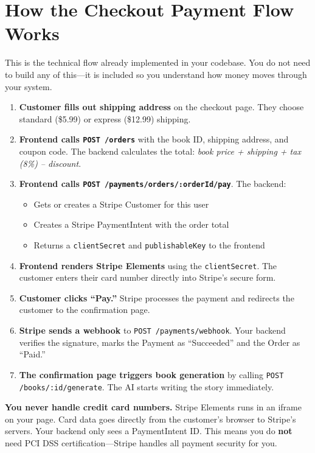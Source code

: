 \documentclass[12pt, letterpaper, oneside]{book}
\begin{document}
\section{How the Checkout Payment Flow Works}

This is the technical flow already implemented in your codebase. You do not need to build any of this---it is included so you understand how money moves through your system.

\begin{enumerate}[leftmargin=2em]
  \item \textbf{Customer fills out shipping address} on the checkout page. They choose standard (\$5.99) or express (\$12.99) shipping.
  \item \textbf{Frontend calls \texttt{POST /orders}} with the book ID, shipping address, and coupon code. The backend calculates the total: \textit{book price + shipping + tax (8\%) -- discount}.
  \item \textbf{Frontend calls \texttt{POST /payments/orders/:orderId/pay}}. The backend:
    \begin{itemize}[leftmargin=1.5em]
      \item Gets or creates a Stripe Customer for this user
      \item Creates a Stripe PaymentIntent with the order total
      \item Returns a \texttt{clientSecret} and \texttt{publishableKey} to the frontend
    \end{itemize}
  \item \textbf{Frontend renders Stripe Elements} using the \texttt{clientSecret}. The customer enters their card number directly into Stripe's secure form.
  \item \textbf{Customer clicks ``Pay.''} Stripe processes the payment and redirects the customer to the confirmation page.
  \item \textbf{Stripe sends a webhook} to \texttt{POST /payments/webhook}. Your backend verifies the signature, marks the Payment as ``Succeeded'' and the Order as ``Paid.''
  \item \textbf{The confirmation page triggers book generation} by calling \texttt{POST /books/:id/generate}. The AI starts writing the story immediately.
\end{enumerate}

\begin{infobox}
\textbf{You never handle credit card numbers.} Stripe Elements runs in an iframe on your page. Card data goes directly from the customer's browser to Stripe's servers. Your backend only sees a PaymentIntent ID. This means you do \textbf{not} need PCI DSS certification---Stripe handles all payment security for you.
\end{infobox}
\end{document}
